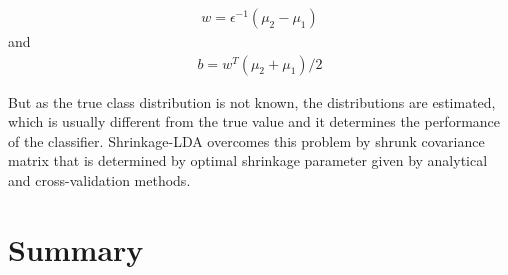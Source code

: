 \begin{equation} \label{eq:lda_w}
    \begin{split}
        w = \epsilon^{-1} (\mu_2 - \mu_1)
    \end{split}
\end{equation}
and
\begin{equation} \label{eq:lda_b}
    \begin{split}
        b = w^T(\mu_2 + \mu_1)/2
    \end{split}
\end{equation}

 But as the true class distribution is not known, the distributions are estimated, which is usually different from the true value  and it determines the performance of the classifier. Shrinkage-LDA overcomes this problem by shrunk covariance matrix that is determined by optimal shrinkage parameter given by analytical and cross-validation methods.

\section*{Summary}